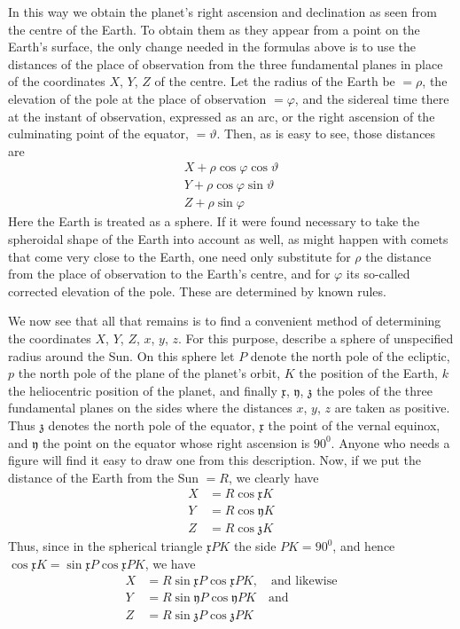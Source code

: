 In this way we obtain the planet’s right ascension and declination as seen from the
centre of the Earth. To obtain them as they appear from a point on the Earth’s surface,
the only change needed in the formulas above is to use the distances of the place
of observation from the three fundamental planes in place of the coordinates
$X$, $Y$, $Z$ of the centre. Let the radius of the Earth be $=\rho$,
the elevation of the pole at the place of observation $=\varphi$, and the sidereal
time there at the instant of observation, expressed as an arc, or the right ascension
of the culminating point of the equator, $=\vartheta$. Then, as is easy to see,
those distances are
\[
\begin{gathered}
X+\rho\cos\varphi\cos\vartheta\\
Y+\rho\cos\varphi\sin\vartheta\\
Z+\rho\sin\varphi
\end{gathered}
\]
Here the Earth is treated as a sphere. If it were found necessary to take the
spheroidal shape of the Earth into account as well, as might happen with comets
that come very close to the Earth, one need only substitute for $\rho$ the distance
from the place of observation to the Earth’s centre, and for $\varphi$ its
so-called corrected elevation of the pole. These are determined by known rules.

We now see that all that remains is to find a convenient method of determining
the coordinates $X$, $Y$, $Z$, $x$, $y$, $z$. For this purpose, describe a sphere
of unspecified radius around the Sun. On this sphere let $P$ denote the north pole
of the ecliptic, $p$ the north pole of the plane of the planet’s orbit, $K$ the
position of the Earth, $k$ the heliocentric position of the planet, and finally
$\mathfrak{x}$, $\mathfrak{y}$, $\mathfrak{z}$ the poles of the three fundamental planes
on the sides where the distances $x$, $y$, $z$ are taken as positive.
%
Thus $\mathfrak{z}$ denotes the north pole of the equator, $\mathfrak{x}$ the point
of the vernal equinox, and $\mathfrak{y}$ the point on the equator whose right
ascension is $90^0$. Anyone who needs a figure will find it easy to draw one from
this description. Now, if we put the distance of the Earth from the Sun $=R$,
we clearly have
\[
\begin{aligned}
X&=R\cos\mathfrak{x}K\\
Y&=R\cos\mathfrak{y}K\\
Z&=R\cos\mathfrak{z}K
\end{aligned}
\]
Thus, since in the spherical triangle $\mathfrak{x}PK$ the side $PK=90^0$,
and hence $\cos\mathfrak{x}K=\sin\mathfrak{x}P\cos\mathfrak{x}PK$, we have
\[
\begin{aligned}
X&=R\sin\mathfrak{x}P\cos\mathfrak{x}PK,\quad\text{and likewise}\\
Y&=R\sin\mathfrak{y}P\cos\mathfrak{y}PK\quad\text{and}\\
Z&=R\sin\mathfrak{z}P\cos\mathfrak{z}PK
\end{aligned}
\]

